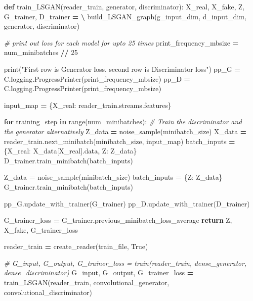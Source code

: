 \documentclass[]{book}
\newenvironment{Shaded}{\begin{snugshade}}{\end{snugshade}}
\newcommand{\KeywordTok}[1]{\textcolor[rgb]{0.13,0.29,0.53}{\textbf{#1}}}
\newcommand{\DecValTok}[1]{\textcolor[rgb]{0.00,0.00,0.81}{#1}}
\newcommand{\StringTok}[1]{\textcolor[rgb]{0.31,0.60,0.02}{#1}}
\newcommand{\CommentTok}[1]{\textcolor[rgb]{0.56,0.35,0.01}{\textit{#1}}}
\newcommand{\VariableTok}[1]{\textcolor[rgb]{0.00,0.00,0.00}{#1}}
\newcommand{\ControlFlowTok}[1]{\textcolor[rgb]{0.13,0.29,0.53}{\textbf{#1}}}
\newcommand{\OperatorTok}[1]{\textcolor[rgb]{0.81,0.36,0.00}{\textbf{#1}}}
\newcommand{\BuiltInTok}[1]{#1}
\newcommand{\NormalTok}[1]{#1}
\theoremstyle{definition}
\theoremstyle{definition}
\theoremstyle{definition}
\theoremstyle{remark}
\begin{document}
\begin{Shaded}
\begin{Highlighting}[]
\KeywordTok{def}\NormalTok{ train_LSGAN(reader_train, generator, discriminator):}
\NormalTok{    X_real, X_fake, Z, G_trainer, D_trainer }\OperatorTok{=} \OperatorTok{\textbackslash{}}
\NormalTok{        build_LSGAN_graph(g_input_dim, d_input_dim, generator, discriminator)}
        
    \CommentTok{# print out loss for each model for upto 25 times}
\NormalTok{    print_frequency_mbsize }\OperatorTok{=}\NormalTok{ num_minibatches }\OperatorTok{//} \DecValTok{25}
    
    \BuiltInTok{print}\NormalTok{(}\StringTok{"First row is Generator loss, second row is Discriminator loss"}\NormalTok{)}
\NormalTok{    pp_G }\OperatorTok{=}\NormalTok{ C.logging.ProgressPrinter(print_frequency_mbsize)}
\NormalTok{    pp_D }\OperatorTok{=}\NormalTok{ C.logging.ProgressPrinter(print_frequency_mbsize)}
    
    
\NormalTok{    input_map }\OperatorTok{=}\NormalTok{ \{X_real: reader_train.streams.features\}}

    \ControlFlowTok{for}\NormalTok{ training_step }\KeywordTok{in} \BuiltInTok{range}\NormalTok{(num_minibatches):}
        \CommentTok{# Train the discriminator and the generator alternatively}
\NormalTok{        Z_data }\OperatorTok{=}\NormalTok{ noise_sample(minibatch_size)}
\NormalTok{        X_data }\OperatorTok{=}\NormalTok{ reader_train.next_minibatch(minibatch_size, input_map)}
\NormalTok{        batch_inputs }\OperatorTok{=}\NormalTok{ \{X_real: X_data[X_real].data, Z: Z_data\}}
\NormalTok{        D_trainer.train_minibatch(batch_inputs)}
        
\NormalTok{        Z_data }\OperatorTok{=}\NormalTok{ noise_sample(minibatch_size)}
\NormalTok{        batch_inputs }\OperatorTok{=}\NormalTok{ \{Z: Z_data\}}
\NormalTok{        G_trainer.train_minibatch(batch_inputs)}
        
\NormalTok{        pp_G.update_with_trainer(G_trainer)}
\NormalTok{        pp_D.update_with_trainer(D_trainer)}

\NormalTok{    G_trainer_loss }\OperatorTok{=}\NormalTok{ G_trainer.previous_minibatch_loss_average}
    \ControlFlowTok{return}\NormalTok{ Z, X_fake, G_trainer_loss}
\end{Highlighting}
\end{Shaded}

\begin{Shaded}
\begin{Highlighting}[]
\NormalTok{reader_train }\OperatorTok{=}\NormalTok{ create_reader(train_file, }\VariableTok{True}\NormalTok{)}

\CommentTok{# G_input, G_output, G_trainer_loss = train(reader_train, dense_generator, dense_discriminator)}
\NormalTok{G_input, G_output, G_trainer_loss }\OperatorTok{=}\NormalTok{ train_LSGAN(reader_train,}
\NormalTok{                                          convolutional_generator,}
\NormalTok{                                          convolutional_discriminator)}
\end{Highlighting}
\end{Shaded}
\end{document}
